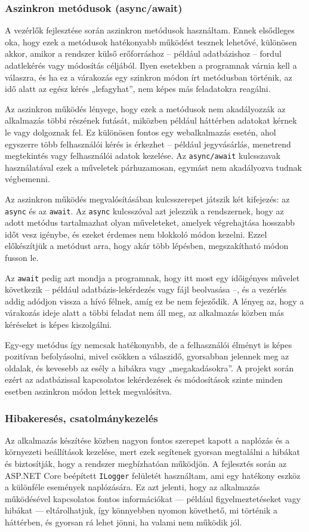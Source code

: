 \subsubsection{Aszinkron metódusok (async/await)}
A vezérlők fejlesztése során aszinkron metódusok használtam. Ennek elsődleges oka, hogy ezek a metódusok hatékonyabb működést tesznek lehetővé, különösen akkor, amikor a rendszer külső erőforráshoz – például adatbázishoz – fordul adatlekérés vagy módosítás céljából. Ilyen esetekben a programnak várnia kell a válaszra, és ha ez a várakozás egy szinkron módon írt metódusban történik, az idő alatt az egész kérés „lefagyhat”, nem képes más feladatokra reagálni.

Az aszinkron működés lényege, hogy ezek a metódusok nem akadályozzák az alkalmazás többi részének futását, miközben például háttérben adatokat kérnek le vagy dolgoznak fel. Ez különösen fontos egy webalkalmazás esetén, ahol egyszerre több felhasználói kérés is érkezhet – például jegyvásárlás, menetrend megtekintés vagy felhasználói adatok kezelése. Az \texttt{async/await} kulcsszavak használatával ezek a műveletek párhuzamosan, egymást nem akadályozva tudnak végbemenni.

Az aszinkron működés megvalósításában kulcsszerepet játszik két kifejezés: az \texttt{async} és az \texttt{await}. Az \texttt{async} kulcsszóval azt jelezzük a rendszernek, hogy az adott metódus tartalmazhat olyan műveleteket, amelyek végrehajtása hosszabb időt vesz igénybe, és ezeket érdemes nem blokkoló módon kezelni. Ezzel előkészítjük a metódust arra, hogy akár több lépésben, megszakítható módon fusson le.

Az \texttt{await} pedig azt mondja a programnak, hogy itt most egy időigényes művelet következik – például adatbázis-lekérdezés vagy fájl beolvasása –, és a vezérlés addig adódjon vissza a hívó félnek, amíg ez be nem fejeződik. A lényeg az, hogy a várakozás ideje alatt a többi feladat nem áll meg, az alkalmazás közben más kéréseket is képes kiszolgálni.

Egy-egy metódus így nemcsak hatékonyabb, de a felhasználói élményt is képes pozitívan befolyásolni, mivel csökken a válaszidő, gyorsabban jelennek meg az oldalak, és kevesebb az esély a hibákra vagy „megakadásokra”. A projekt során ezért az adatbázissal kapcsolatos lekérdezések és módosítások szinte minden esetben aszinkron módon lettek megvalósítva.

\subsubsection{Hibakeresés, csatolmánykezelés}
Az alkalmazás készítése közben nagyon fontos szerepet kapott a naplózás és a környezeti beállítások kezelése, mert ezek segítenek gyorsan megtalálni a hibákat és biztosítják, hogy a rendszer megbízhatóan működjön. A fejlesztés során az ASP.NET Core beépített \texttt{ILogger} felületét használtam, ami egy hatékony eszköz a különféle események naplózására. Ez azt jelenti, hogy az alkalmazás működésével kapcsolatos fontos információkat — például figyelmeztetéseket vagy hibákat — eltárolhatjuk, így könnyebben nyomon követhető, mi történik a háttérben, és gyorsan rá lehet jönni, ha valami nem működik jól.


